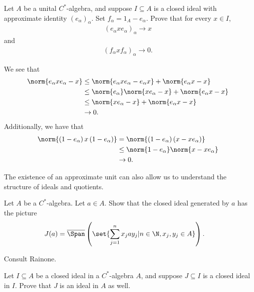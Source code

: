 \documentclass[10pt]{mypackage}
\begin{document}
\begin{exercise}
  Let $A$ be a unital $C^{\ast}$-algebra, and suppose $I\subseteq A$ is a closed ideal with approximate identity $\left(e_{\alpha}\right)_{\alpha}$. Set $f_{\alpha} = 1_A - e_{\alpha}$. Prove that for every $x\in I$,
  \begin{align*}
    \left(e_{\alpha}xe_{\alpha}\right)_{\alpha}\rightarrow x
  \end{align*}
  and
  \begin{align*}
    \left(f_{\alpha}xf_{\alpha}\right)_{\alpha}\rightarrow 0.
  \end{align*}
\end{exercise}
\begin{solution}
  We see that
  \begin{align*}
    \norm{e_{\alpha}xe_{\alpha}-x} &\leq \norm{e_{\alpha}xe_{\alpha}-e_{\alpha}x} + \norm{e_{\alpha}x-x}\\
                                   &\leq \norm{e_{\alpha}}\norm{xe_{\alpha}-x} + \norm{e_{\alpha}x-x}\\
                                   &\leq \norm{xe_{\alpha}-x} + \norm{e_{\alpha}x - x}\\
                                   &\rightarrow 0.
  \end{align*}
  Additionally, we have that
  \begin{align*}
    \norm{\left(1-e_{\alpha}\right)x\left(1-e_{\alpha}\right)} &= \norm{\left(1-e_{\alpha}\right)\left(x-xe_{\alpha}\right)} \\
                                                               &\leq \norm{1-e_{\alpha}}\norm{x-xe_{\alpha}}\\
                                                               &\rightarrow 0.
  \end{align*}
\end{solution}
The existence of an approximate unit can also allow us to understand the structure of ideals and quotients.
\begin{exercise}
  Let $A$ be a $C^{\ast}$-algebra. Let $a\in A$. Show that the closed ideal generated by $a$ has the picture
  \begin{align*}
    J(a) &= \overline{\Span}\left(\set{\sum_{j=1}^{n}x_jay_j | n\in\N,x_j,y_j\in A}\right).
  \end{align*}
\end{exercise}
\begin{solution}[]
  Consult Rainone.
\end{solution}
\begin{exercise}
  Let $I\subseteq A$ be a closed ideal in a $C^{\ast}$-algebra $A$, and suppose $J\subseteq I$ is a closed ideal in $I$. Prove that $J$ is an ideal in $A$ as well.
\end{exercise}
\end{document}
